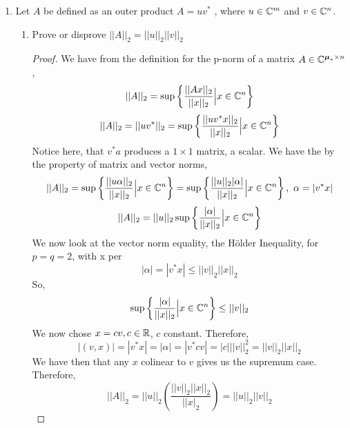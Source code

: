 \documentclass{article}
\begin{document}
\begin{enumerate}
\begin{proof}
    Since we have that $A$ is a real, symmetric matrix, it is true that its eigenvectors form an orthogonal basis which spans $\R^m$. Then we could write $b$ as a linear combination of the eigenvalues of $A$., 
    \[
        b = c_1v_1 + \cdots + c_mv_m = A(d_1v_1 + \cdots + d_mv_m), c_i = \alpha_i d_i
    \]  
    We now need to find the scalar coefficients $d_i$ to obtain the correct linear combination. We next look at the inner products $(v_i, b), (v_i, Av_i)$. We have, 
    \[
        (v_i, b) = v_i^T(\alpha_1d_1v_1 + \cdots + \alpha_md_mv_m) = \alpha_id_iv_i^Tv_i
    \]
    The inner product of $v_i$ with any $v_j, i\neq j$ is zero by orthogonality, so only the $v_i^Tv_i$ term remains. 
    \[
        (v_i, Av_i) = v_i^T(Av_i) = v_i^T(\alpha_iv_i) = \alpha_i v_i^Tv_i
    \]
    We have then that, $\frac{(v_i, b)}{(v_i, Av_i)} = d_i$. Therefore we can now write, 
    \[
        x = \sum_{i=1}^m \frac{(v_i, b)}{(v_i, Av_i)}v_i = \sum_{i=1}^m \frac{v_i^T b}{v_i^TAv_i}v_i
    \]
    \end{proof} 

    \item %
    Let $A$ be defined as an outer product $A = uv^*$ , where $u \in \mathbb{C}^m$ and $v \in \mathbb{C}^n$.
    \begin{enumerate}
        \item
        Prove or disprove $||A||_2 = ||u||_2||v||_2$
        \begin{proof}
            We have from the definition for the p-norm of a matrix $A \in \mathbb{C}^{\boldsymbol{\mu}_* \times n}$, 
            \[
                ||A||_2 = \sup\left\{\frac{||Ax||_2}{||x||_2} \Big| x \in \mathbb{C}^n\right\}
            \]   
            \[
                ||A||_2 = ||u v^*||_2 = \sup\left\{\frac{||uv^*x||_2}{||x||_2} \Big| x\in \mathbb{C}^n\right\}
            \]
            Notice here, that $v^*a$ produces a $1\times 1$ matrix, a scalar. We have the by the property of matrix and vector norms, 
            \[
                ||A||_2 = \sup\left\{\frac{||u\alpha||_2}{||x||_2} \Big| x\in \mathbb{C}^n\right\} = \sup\left\{\frac{||u||_2|\alpha|}{||x||_2} \Big| x\in \mathbb{C}^n\right\}, \text{ } \alpha = |v^*x|
            \]
            \[
                ||A||_2 = ||u||_2\sup\left\{\frac{|\alpha|}{||x||_2} \Big| x\in \mathbb{C}^n\right\}
            \]
            We now look at the vector norm equality, the H\"{o}lder Inequality, for $p = q = 2$, with x per
            \[
                |\alpha| = |v^*x| \le ||v||_2||x||_2
            \]
            So, 
            \[
                \sup\left\{\frac{|\alpha|}{||x||_2} \Big| x\in \mathbb{C}^n\right\} \le ||v||_2
            \]
            We now chose $x = cv, c \in \mathbb{R}$, $c$ constant. Therefore, 
            \[
                |(v, x)| = |v^*x| =|\alpha|= |v^*cv| = |c|||v||_2^2 = ||v||_2||x||_2
            \]
            We have then that any $x$ colinear to $v$ gives us the supremum case. Therefore, 
            \[
                ||A||_2 = ||u||_2\left(\frac{||v||_2||x||_2}{||x|_2}\right) = ||u||_2||v||_2
            \]
        \end{proof}


\end{enumerate}
\end{enumerate}
\end{document}
